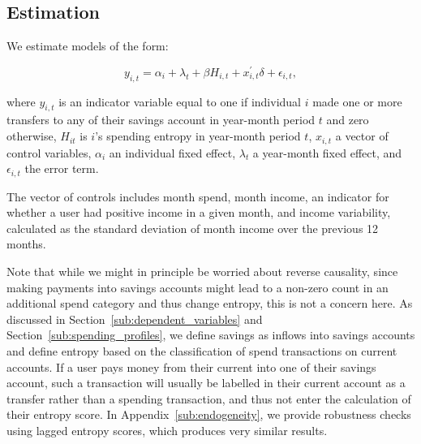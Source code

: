 \subsection{Estimation}%
\label{sub:estimation}

We estimate models of the form: 

\begin{equation}
    \label{equ:model}
    y_{i,t} = \alpha_i + \lambda_t + \beta H_{i,t} + x^\prime_{i,t} \delta +
    \epsilon_{i,t},
\end{equation}

\noindent where $y_{i,t}$ is an indicator variable equal to one if individual $i$ made
one or more transfers to any of their savings account in year-month period $t$ and zero
otherwise, $H_{it}$ is $i$'s spending entropy in year-month period $t$, $x_{i,t}$ a vector
of control variables, $\alpha_i$ an individual fixed effect, $\lambda_t$ a
year-month fixed effect, and $\epsilon_{i, t}$ the error term.

The vector of controls includes month spend, month income, an indicator for
whether a user had positive income in a given month, and income
variability, calculated as the standard deviation of month income over the
previous 12 months.

Note that while we might in principle be worried about reverse causality, since
making payments into savings accounts might lead to a non-zero count in an
additional spend category and thus change entropy, this is not a concern here.
As discussed in Section~\ref{sub:dependent_variables} and
Section~\ref{sub:spending_profiles}, we define savings as inflows into savings
accounts and define entropy based on the classification of spend transactions
on current accounts. If a user pays money from their current into one of their
savings account, such a transaction will usually be labelled in their current
account as a transfer rather than a spending transaction, and thus not enter
the calculation of their entropy score. In Appendix~\ref{sub:endogeneity}, we
provide robustness checks using lagged entropy scores, which produces very
similar results.

